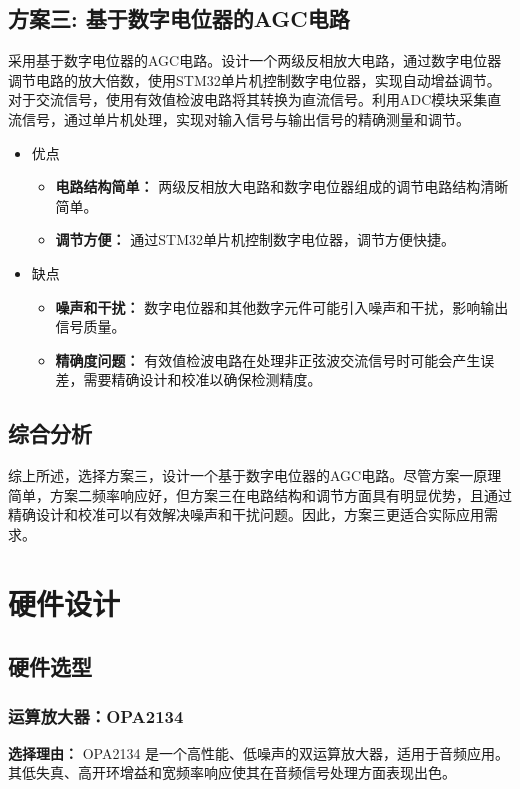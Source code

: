\documentclass[lang=cn,11pt,a4paper]{elegantpaper}
\begin{document}
\subsection{方案三: 基于数字电位器的AGC电路}

采用基于数字电位器的AGC电路。设计一个两级反相放大电路，通过数字电位器调节电路的放大倍数，使用STM32单片机控制数字电位器，实现自动增益调节。对于交流信号，使用有效值检波电路将其转换为直流信号。利用ADC模块采集直流信号，通过单片机处理，实现对输入信号与输出信号的精确测量和调节。

\begin{itemize}
  \item  优点
        \begin{itemize}
          \item \textbf{电路结构简单：} 两级反相放大电路和数字电位器组成的调节电路结构清晰简单。
          \item \textbf{调节方便：} 通过STM32单片机控制数字电位器，调节方便快捷。
        \end{itemize}

  \item 缺点
        \begin{itemize}
          \item \textbf{噪声和干扰：} 数字电位器和其他数字元件可能引入噪声和干扰，影响输出信号质量。
          \item \textbf{精确度问题：} 有效值检波电路在处理非正弦波交流信号时可能会产生误差，需要精确设计和校准以确保检测精度。
        \end{itemize}
\end{itemize}
\subsection{综合分析}

综上所述，选择方案三，设计一个基于数字电位器的AGC电路。尽管方案一原理简单，方案二频率响应好，但方案三在电路结构和调节方面具有明显优势，且通过精确设计和校准可以有效解决噪声和干扰问题。因此，方案三更适合实际应用需求。

\section{硬件设计}
\subsection{硬件选型}

\subsubsection{运算放大器：OPA2134}
\textbf{选择理由：} OPA2134 是一个高性能、低噪声的双运算放大器，适用于音频应用。其低失真、高开环增益和宽频率响应使其在音频信号处理方面表现出色。
\end{document}
